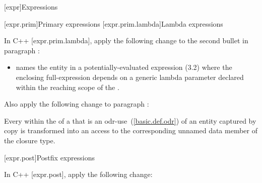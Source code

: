 [expr]{Expressions}

\setcounter{section}{0}
[expr.prim]{Primary expressions}
\setcounter{subsection}{1}
[expr.prim.lambda]{Lambda expressions}

\pnum
In C++ [expr.prim.lambda], apply the following change to the second bullet in paragraph :

\renewcommand{\labelitemi}{---}
\begin{std.txt}
\begin{itemize}
\item names the entity in a potentially-evaluated expression (3.2) where the enclosing full-expression depends on a generic lambda parameter declared within the reaching scope of the .
\end{itemize}
\end{std.txt}
\renewcommand{\labelitemi}{---\parabullnum{Bullets1}{\labelsep}}

\pnum
Also apply the following change to paragraph :

\begin{std.txt}
Every  within the  of a  that is an odr-use~(\ref{basic.def.odr}) of an entity captured by copy is transformed into an access to the corresponding unnamed data member of the closure type.
\end{std.txt}

[expr.post]{Postfix expressions}

\pnum
In C++ [expr.post], apply the following change:

